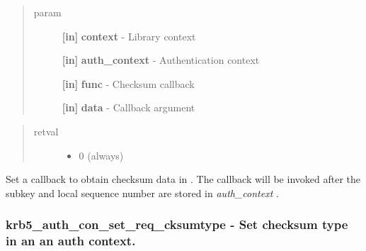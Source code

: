 \documentclass[letterpaper,10pt,english]{sphinxmanual}
\begin{document}
\begin{quote}\begin{description}
\item[{param}] \leavevmode
\textbf{{[}in{]}} \textbf{context} - Library context

\textbf{{[}in{]}} \textbf{auth\_context} - Authentication context

\textbf{{[}in{]}} \textbf{func} - Checksum callback

\textbf{{[}in{]}} \textbf{data} - Callback argument

\end{description}\end{quote}
\begin{quote}\begin{description}
\item[{retval}] \leavevmode\begin{itemize}
\item {} 
0   (always)

\end{itemize}

\end{description}\end{quote}

Set a callback to obtain checksum data in {\hyperref[appdev/refs/api/krb5_mk_req:krb5_mk_req]{}} . The callback will be invoked after the subkey and local sequence number are stored in \emph{auth\_context} .


\subsubsection{krb5\_auth\_con\_set\_req\_cksumtype -  Set checksum type in an an auth context.}
\label{appdev/refs/api/krb5_auth_con_set_req_cksumtype:krb5-auth-con-set-req-cksumtype-set-checksum-type-in-an-an-auth-context}\label{appdev/refs/api/krb5_auth_con_set_req_cksumtype::doc}

\begin{fulllineitems}
\label{appdev/refs/api/krb5_auth_con_set_req_cksumtype:krb5_auth_con_set_req_cksumtype}
\end{fulllineitems}
\end{document}
